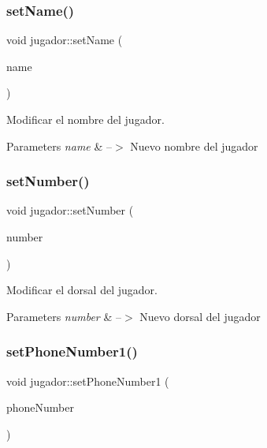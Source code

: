 \subsubsection{\texorpdfstring{set\+Name()}{setName()}}
{\footnotesize\ttfamily void jugador\+::set\+Name (\begin{DoxyParamCaption}\item[{Q\+String}]{name }\end{DoxyParamCaption})}



Modificar el nombre del jugador. 


\begin{DoxyParams}{Parameters}
{\em name} & --$>$ Nuevo nombre del jugador \\
\hline
\end{DoxyParams}
\mbox{\label{classjugador_aa393b3dfb2eb1f269e66eb0b9e673973}} 
\subsubsection{\texorpdfstring{set\+Number()}{setNumber()}}
{\footnotesize\ttfamily void jugador\+::set\+Number (\begin{DoxyParamCaption}\item[{int}]{number }\end{DoxyParamCaption})}



Modificar el dorsal del jugador. 


\begin{DoxyParams}{Parameters}
{\em number} & --$>$ Nuevo dorsal del jugador \\
\hline
\end{DoxyParams}
\mbox{\label{classjugador_aaa04ccc1da6c45dea35b723a54e217d4}} 
\subsubsection{\texorpdfstring{set\+Phone\+Number1()}{setPhoneNumber1()}}
{\footnotesize\ttfamily void jugador\+::set\+Phone\+Number1 (\begin{DoxyParamCaption}\item[{Q\+String}]{phone\+Number }\end{DoxyParamCaption})}



